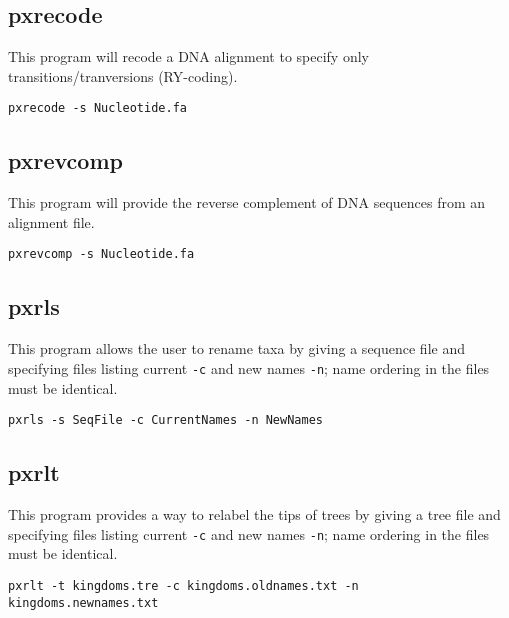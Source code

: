 \documentclass[12pt,letterpaper]{memoir}
\begin{document}
\subsection{pxrecode}

This program will recode a DNA alignment to specify only transitions/tranversions (RY-coding).

\begin{flushleft}
\begin{verbatim}
pxrecode -s Nucleotide.fa
\end{verbatim}
\end{flushleft}

\subsection{pxrevcomp}

This program will provide the reverse complement of DNA sequences from an alignment file.

\begin{flushleft}
\begin{verbatim}
pxrevcomp -s Nucleotide.fa
\end{verbatim}
\end{flushleft}

\subsection{pxrls}

This program allows the user to rename taxa by giving a sequence file and specifying files listing current \texttt{-c} and new names \texttt{-n}; name ordering in the files must be identical.

\begin{flushleft}
\begin{verbatim}
pxrls -s SeqFile -c CurrentNames -n NewNames
\end{verbatim}
\end{flushleft}


\subsection{pxrlt}

This program provides a way to relabel the tips of trees by giving a tree file and specifying files listing current \texttt{-c} and new names \texttt{-n}; name ordering in the files must be identical.

\begin{flushleft}
\begin{verbatim}
pxrlt -t kingdoms.tre -c kingdoms.oldnames.txt -n kingdoms.newnames.txt
\end{verbatim}
\end{flushleft}
\end{document}
